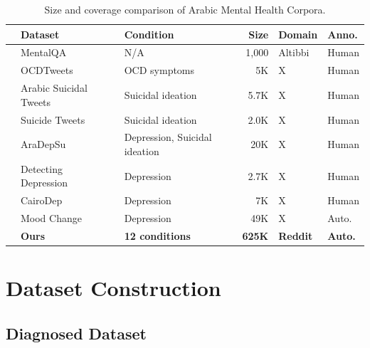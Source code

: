\documentclass[11pt]{article}
\begin{document}
\begin{table}
\centering
\small
\begin{tabular}{cl l rll}
\toprule
& \textbf{Dataset} & \textbf{Condition} & \textbf{Size} & \textbf{Domain} & \textbf{Anno.} \\
\midrule
& MentalQA~\cite{alhuzali2024mentalqa} & N/A & 1,000 & Altibbi & Human \\
& OCDTweets~\cite{al2024classification} & OCD symptoms & 5K & X & Human \\
& Arabic Suicidal Tweets~\cite{abdulsalam2024detecting} & Suicidal ideation & 5.7K & X & Human \\
& Suicide Tweets~\cite{baghdadi2022optimized} & Suicidal ideation & 2.0K & X & Human \\
& AraDepSu~\cite{hassib2022aradepsu} & Depression, Suicidal ideation & 20K & X & Human \\
& Detecting Depression~\cite{almouzini2019detecting} & Depression & 2.7K & X & Human \\
& CairoDep~\cite{elramly2021cairodep} & Depression & 7K & X & Human \\
& Mood Change~\cite{maghraby2022mood} & Depression & 49K & X & Auto. \\
\midrule
& \textbf{Ours} & \textbf{12 conditions} & \textbf{625K} & \textbf{Reddit} & \textbf{Auto.} \\

\bottomrule
\end{tabular}
\caption{Size and coverage comparison of Arabic Mental Health Corpora.}

\label{tab:arabic_datasets}
\end{table}



\section{Dataset Construction}
\label{subsec:data_source}

\subsection{Diagnosed Dataset}
\end{document}
